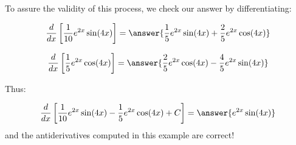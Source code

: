 \documentclass{ximera}
\begin{document}
\begin{exercise}
\begin{exercise}
\begin{exercise}
\begin{exercise}
To assure the validity of this process, we check our answer by differentiating:

\[
\frac{d}{dx} \left[\frac{1}{10} e^{2x}\sin(4x) \right] = \answer{\frac{1}{5}e^{2x}\sin(4x)+\frac{2}{5} e^{2x} \cos(4x)}
\]

\[
\frac{d}{dx} \left[\frac{1}{5} e^{2x}\cos(4x) \right] = \answer{\frac{2}{5}e^{2x}\cos(4x)-\frac{4}{5} e^{2x} \sin(4x)}
\]

\begin{exercise}
Thus:

\[
\frac{d}{dx} \left[\frac{1}{10}e^{2x}\sin(4x)-\frac{1}{5}e^{2x}\cos(4x) +C\right] = \answer{e^{2x}\sin(4x)}
\] 
and the antiderivatives computed in this example are correct!



\end{exercise}

\end{exercise}

\end{exercise}
\end{exercise}
\end{exercise}
\end{document}
